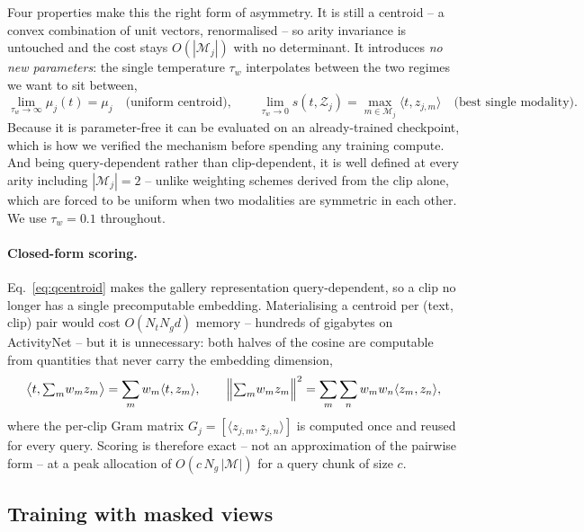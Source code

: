 Four properties make this the right form of asymmetry. It is still a centroid -- a
convex combination of unit vectors, renormalised -- so arity invariance is untouched
and the cost stays $O(|\mathcal{M}_j|)$ with no determinant. It introduces
\emph{no new parameters}: the single temperature $\tau_w$ interpolates between the two
regimes we want to sit between,
\begin{equation}
  \lim_{\tau_w \to \infty} \mu_j(t) = \mu_j
  \quad\text{(uniform centroid)},
  \qquad
  \lim_{\tau_w \to 0} s(t, \mathcal{Z}_j) = \max_{m \in \mathcal{M}_j} \langle t, z_{j,m}\rangle
  \quad\text{(best single modality)} .
  \label{eq:limits}
\end{equation}
Because it is parameter-free it can be evaluated on an already-trained checkpoint,
which is how we verified the mechanism before spending any training compute. And
being query-dependent rather than clip-dependent, it is well defined at every arity
including $|\mathcal{M}_j| = 2$ -- unlike weighting schemes derived from the clip
alone, which are forced to be uniform when two modalities are symmetric in each
other. We use $\tau_w = 0.1$ throughout.

\paragraph{Closed-form scoring.}
Eq.~\eqref{eq:qcentroid} makes the gallery representation query-dependent, so a clip
no longer has a single precomputable embedding. Materialising a centroid per
(text, clip) pair would cost $O(N_t N_g d)$ memory -- hundreds of gigabytes on
ActivityNet -- but it is unnecessary: both halves of the cosine are computable from
quantities that never carry the embedding dimension,
\begin{equation}
  \bigl\langle t, {\textstyle\sum_m} w_m z_m \bigr\rangle = \sum_{m} w_m \langle t, z_m \rangle,
  \qquad
  \Bigl\| {\textstyle\sum_m} w_m z_m \Bigr\|^2 = \sum_{m}\sum_{n} w_m w_n \langle z_m, z_n \rangle,
  \label{eq:closedform}
\end{equation}
where the per-clip Gram matrix $G_j = [\langle z_{j,m}, z_{j,n}\rangle]$ is computed
once and reused for every query. Scoring is therefore exact -- not an approximation of
the pairwise form -- at a peak allocation of $O(c\,N_g\,|\mathcal{M}|)$ for a query
chunk of size $c$.

\subsection{Training with masked views}
\label{sec:masked-views}

